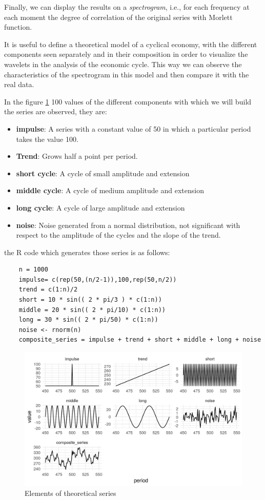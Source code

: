 \documentclass[a4paper,10cpi]{article}
\begin{document}
	Finally, we can display the results on a \textit{spectrogram}, i.e., for each frequency at each moment the degree of correlation of the original series with Morlett function.
	
	
	It is useful to define a theoretical model of a cyclical economy, with the different components seen separately and in their composition in order to visualize the wavelets in the analysis of the economic cycle. This way we can observe the characteristics of the spectrogram in this model and then compare it with the real data.
	
	In the figure \ref{fig:serie_teorica} 100 values of the different components with which we will build the series are observed, they are:
	
	
	\begin{itemize}
		
		\item \textbf{impulse}: A series with a constant value of 50 in which a particular period takes the value 100.
		\item \textbf{Trend}: Grows half a point per period.
		\item \textbf{short cycle}: A cycle of small amplitude and extension
		\item \textbf{middle cycle}: A cycle of medium amplitude and extension
		\item \textbf{long cycle}: A cycle of large amplitude and extension
		\item \textbf{noise}: Noise generated from a normal distribution, not significant with respect to the amplitude of the cycles and the slope of the trend.
	\end{itemize}
	
	the R code which generates those series is as follows:
	
	\begin{lstlisting}
	n = 1000
	impulse= c(rep(50,(n/2-1)),100,rep(50,n/2))
	trend = c(1:n)/2
	short = 10 * sin(( 2 * pi/3 ) * c(1:n))
	middle = 20 * sin(( 2 * pi/10) * c(1:n))
	long = 30 * sin(( 2 * pi/50) * c(1:n))
	noise <- rnorm(n)
	composite_series = impulse + trend + short + middle + long + noise
	\end{lstlisting}
	
	
	\begin{figure}[H]
		\centering
		\includegraphics[width=\linewidth]{serie_teorica_en.PNG}
		\caption{Elements of theoretical series} \label{fig:serie_teorica}
	\end{figure}
	
\end{document}
